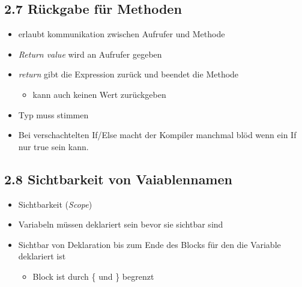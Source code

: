 \documentclass[11pt]{article}
\begin{document}
\subsection{2.7 Rückgabe für Methoden}
\label{sec:orgfd3f221}
\begin{itemize}
\item erlaubt kommunikation zwischen Aufrufer und Methode\\
\item \emph{Return value} wird an Aufrufer gegeben\\
\item \emph{return} gibt die Expression zurück und beendet die Methode\\
\begin{itemize}
\item kann auch keinen Wert zurückgeben\\
\end{itemize}
\item Typ muss stimmen\\
\item Bei verschachtelten If/Else macht der Kompiler manchmal blöd wenn ein If nur true sein kann.\\
\end{itemize}

\subsection{2.8 Sichtbarkeit von Vaiablennamen}
\label{sec:org0dfdd60}
\begin{itemize}
\item Sichtbarkeit (\emph{Scope})\\
\item Variabeln müssen deklariert sein bevor sie sichtbar sind\\
\item Sichtbar von Deklaration bis zum Ende des Blocks für den die Variable deklariert ist\\
\begin{itemize}
\item Block ist durch \{ und \} begrenzt\\
\end{itemize}
\end{itemize}
\end{document}

